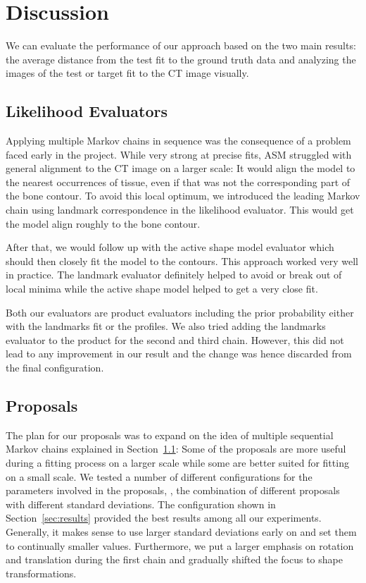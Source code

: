 \section{Discussion}
\label{sec:discussion}

We can evaluate the performance of our approach based on the two main results: the average distance from the test fit to the ground truth data and analyzing the images of the test or target fit to the CT image visually. 


\subsection{Likelihood Evaluators}
\label{subsec:evaluators}

Applying multiple Markov chains in sequence was the consequence of a problem faced early in the project.
While very strong at precise fits, ASM struggled with general alignment to the CT image on a larger scale: It would align the model to the nearest occurrences of tissue, even if that was not the corresponding part of the bone contour.
To avoid this local optimum, we introduced the leading Markov chain using landmark correspondence in the likelihood evaluator.
This would get the model align roughly to the bone contour. 

After that, we would follow up with the active shape model evaluator which should then closely fit the model to the contours. 
This approach worked very well in practice. 
The landmark evaluator definitely helped to avoid or break out of local minima while the active shape model helped to get a very close fit.

Both our evaluators are product evaluators including the prior probability either with the landmarks fit or the profiles.
We also tried adding the landmarks evaluator to the product for the second and third chain.
However, this did not lead to any improvement in our result and the change was hence discarded from the final configuration.


\subsection{Proposals}
\label{subsec:proposals}

The plan for our proposals was to expand on the idea of multiple sequential Markov chains explained in Section~\ref{subsec:evaluators}: Some of the proposals are more useful during a fitting process on a larger scale while some are better suited for fitting on a small scale. 
We tested a number of different configurations for the parameters involved in the proposals, \ie, the combination of different proposals with different standard deviations. 
The configuration shown in Section~\ref{sec:results} provided the best results among all our experiments. 
Generally, it makes sense to use larger standard deviations early on and set them to continually smaller values. 
Furthermore, we put a larger emphasis on rotation and translation during the first chain and gradually shifted the focus to shape transformations.

